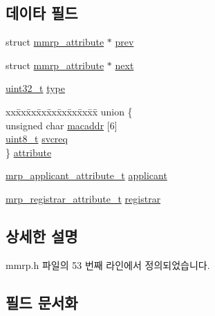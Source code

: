 \subsection*{데이타 필드}
\begin{DoxyCompactItemize}
\item 
struct \hyperlink{structmmrp__attribute}{mmrp\+\_\+attribute} $\ast$ \hyperlink{structmmrp__attribute_a7fbec6f5452666d1234cf6138dc9f0ba}{prev}
\item 
struct \hyperlink{structmmrp__attribute}{mmrp\+\_\+attribute} $\ast$ \hyperlink{structmmrp__attribute_a71b7895c31d4661fc0b66940a640e733}{next}
\item 
\hyperlink{parse_8c_a6eb1e68cc391dd753bc8ce896dbb8315}{uint32\+\_\+t} \hyperlink{structmmrp__attribute_ad44b615021ed3ccb734fcaf583ef4a03}{type}
\item 
\begin{tabbing}
xx\=xx\=xx\=xx\=xx\=xx\=xx\=xx\=xx\=\kill
union \{\\
\>unsigned char \hyperlink{structmmrp__attribute_a3c39313f42d97e1a0bdb140add9ff200}{macaddr} \mbox{[}6\mbox{]}\\
\>\hyperlink{stdint_8h_aba7bc1797add20fe3efdf37ced1182c5}{uint8\_t} \hyperlink{structmmrp__attribute_a4cbde8a8ff7947691adb3e1de9ac37e5}{svcreq}\\
\} \hyperlink{structmmrp__attribute_ab1c9c414897b81c364683779d24d1de1}{attribute}\\

\end{tabbing}\item 
\hyperlink{mrp_8h_a958c5bcf98d8118f9ba46d7b44862232}{mrp\+\_\+applicant\+\_\+attribute\+\_\+t} \hyperlink{structmmrp__attribute_a9ee7e01253c78c410bf44f18a6372d92}{applicant}
\item 
\hyperlink{mrp_8h_a74a88ecd39ca17a8765eb9cbf15b3da9}{mrp\+\_\+registrar\+\_\+attribute\+\_\+t} \hyperlink{structmmrp__attribute_a9e893db6ef01e9cda330159f5d3ee764}{registrar}
\end{DoxyCompactItemize}


\subsection{상세한 설명}


mmrp.\+h 파일의 53 번째 라인에서 정의되었습니다.



\subsection{필드 문서화}
